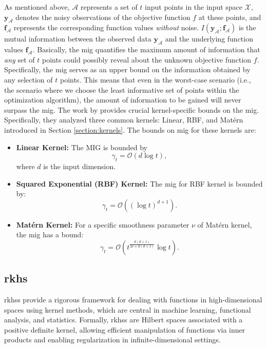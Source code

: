 As mentioned above, $\mathcal{A}$ represents a set of $t$ input points in the input space $\mathcal{X}$, $\mathbf{y}_\mathcal{A}$ denotes the noisy observations of the objective function $f$ at these points, and $\mathbf{f}_\mathcal{A}$ represents the corresponding function values \textit{without} noise. $I(\mathbf{y}_\mathcal{A}; \mathbf{f}_\mathcal{A})$ is the mutual information between the observed data $\mathbf{y}_\mathcal{A}$ and the underlying function values $\mathbf{f}_\mathcal{A}$. Basically, the \ac{mig} quantifies the maximum amount of information that \textit{any} set of $t$ points could possibly reveal about the unknown objective function $f$. Specifically, the \ac{mig} serves as an upper bound on the information obtained by any selection of $t$ points. This means that even in the worst-case scenario (i.e., the scenario where we choose the least informative set of points within the optimization algorithm), the amount of information to be gained will never surpass the \ac{mig}. The work by \citet{srinivas2009gaussian} provides crucial kernel-specific bounds on the \ac{mig}. Specifically, they analyzed three common kernels: Linear, RBF, and Mat\'ern introduced in Section \ref{section:kernels}. The bounds on \ac{mig} for these kernels are:

\begin{itemize}
    \item \textbf{Linear Kernel:}
    The MIG is bounded by
    \[ \gamma_t = \mathcal{O}(d \log t),\]
    where $d$ is the input dimension.

    \item \textbf{Squared Exponential (RBF) Kernel:} The \ac{mig} for RBF kernel is bounded by:
    \[ \gamma_t = \mathcal{O}((\log t)^{d+1}). \]


    \item \textbf{Mat\'ern Kernel:} For a specific smoothness parameter $\nu$ of Mat\'ern kernel, the \ac{mig} has a bound:
     \[ \gamma_t = \mathcal{O} \left( t^\frac{d(d+1)}{2\nu+ d(d+1)} \log t \right). \]
    
\end{itemize}





\subsection{\acf{rkhs}}
\label{background:rkhs}
\acp{rkhs} provide a rigorous framework for dealing with functions in high-dimensional spaces using kernel methods, which are central in machine learning, functional analysis, and statistics. Formally, \acp{rkhs} are Hilbert spaces associated with a positive definite kernel, allowing efficient manipulation of functions via inner products and enabling regularization in infinite-dimensional settings.

